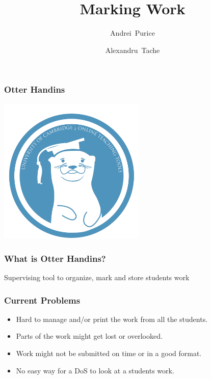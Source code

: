 \documentclass{beamer}
\title %
{Marking Work}
\author[Author, Anders] %
{Andrei~Purice \and Alexandru~Tache}
\begin{document}
	\begin{frame}
		\frametitle{Otter Handins}
		\begin{center}	
		 \includegraphics[height=7cm]{otter.jpg}
		\end{center}
    \end{frame}
    \begin{frame}
    	\frametitle{What is Otter Handins?}
    	\begin{center}
    	Supervising tool to organize, mark and store students work
    	\end{center}
   	\end{frame}
	\begin{frame}
    	\frametitle{Current Problems}
 
   	   	\begin{itemize}
   	   		\item Hard to manage and/or print the work from all the students. 
   	   		\item Parts of the work might get lost or overlooked.
   	   		\item Work might not be submitted on time or in a good format.
   	   		\item No easy way for a DoS to look at a students work.
  	   	 \end{itemize}	   	 
  	\end{frame}
  	
\end{document}
